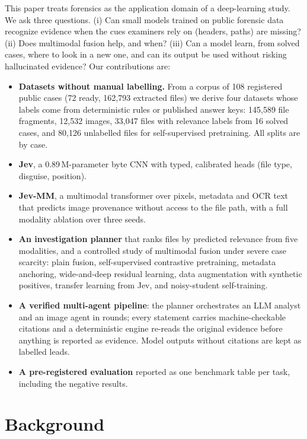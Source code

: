\documentclass[conference]{IEEEtran}
\begin{document}
This paper treats forensics as the application domain of a deep-learning study. We ask three questions. (i) Can
small models trained on public forensic data recognize evidence when the cues examiners rely on (headers, paths)
are missing? (ii) Does multimodal fusion help, and when? (iii) Can a model learn, from solved cases, where to look in
a new one, and can its output be used without risking hallucinated evidence? Our contributions are:
\begin{itemize}
\item \textbf{Datasets without manual labelling.} From a corpus of 108 registered public cases (72 ready, 162{,}793
extracted files) we derive four datasets whose labels come from deterministic rules or published answer keys: 145{,}589
file fragments, 12{,}532 images, 33{,}047 files with relevance labels from 16 solved cases, and 80{,}126 unlabelled
files for self-supervised pretraining. All splits are by case.
\item \textbf{Jev}, a 0.89\,M-parameter byte CNN with typed, calibrated heads (file type, disguise, position).
\item \textbf{Jev-MM}, a multimodal transformer over pixels, metadata and OCR text that predicts image provenance
without access to the file path, with a full modality ablation over three seeds.
\item \textbf{An investigation planner} that ranks files by predicted relevance from five modalities, and a
controlled study of multimodal fusion under severe case scarcity: plain fusion, self-supervised contrastive
pretraining, metadata anchoring, wide-and-deep residual learning, data augmentation with synthetic positives,
transfer learning from Jev, and noisy-student self-training.
\item \textbf{A verified multi-agent pipeline}: the planner orchestrates an LLM analyst and an image agent in rounds;
every statement carries machine-checkable citations and a deterministic engine re-reads the original evidence before
anything is reported as evidence. Model outputs without citations are kept as labelled leads.
\item \textbf{A pre-registered evaluation} reported as one benchmark table per task, including the negative results.
\end{itemize}

\section{Background}
\end{document}
